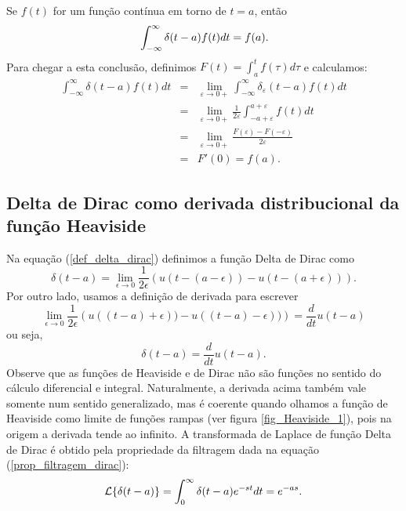 \documentclass[a4paper,10pt]{book}
\begin{document}
 Se $f(t)$ for um função contínua em torno de $t=a$, então
 \begin{equation}{\label{prop_filtragem_dirac}}
 \int_{-\infty}^\infty \delta(t-a)f(t)dt=f(a). 
 \end{equation}
 Para chegar a esta conclusão, definimos $F(t)=\int_a^t f(\tau)d\tau$ e calculamos:
 \begin{eqnarray*}
 \int_{-\infty}^\infty \delta(t-a)f(t)dt&=&\lim_{\varepsilon\to 0+}
 \int_{-\infty}^\infty \delta_\varepsilon(t-a)f(t)dt\\
 &=&\lim_{\varepsilon\to 0+}\frac{1}{2\varepsilon}\int_{-a+\varepsilon}^{a+\varepsilon} f(t)dt\\
 &=&\lim_{\varepsilon\to 0+}\frac{F(\varepsilon)-F(-\varepsilon)}{2\varepsilon}\\
 &=&F'(0)=f(a).
 \end{eqnarray*}
 \subsection{Delta de Dirac como derivada distribucional da função Heaviside}
 Na equação (\ref{def_delta_dirac}) definimos a função Delta de Dirac como
 \begin{equation}
 \delta(t-a)=\lim_{\epsilon\to 0}\frac{1}{2\epsilon}\left(u(t-(a-\epsilon))-u(t-(a+\epsilon))\right).
 \end{equation}
 Por outro lado, usamos a definição de derivada para escrever
 \begin{equation}
 \lim_{\epsilon\to 0}\frac{1}{2\epsilon}\left(u((t-a)+\epsilon))-u((t-a)-\epsilon))\right)=\frac{d}{dt}u(t-a)
 \end{equation}
 ou seja,
 \begin{equation}
 \delta(t-a)=\frac{d}{dt}u(t-a).
 \end{equation}
 Observe que as funções de Heaviside e de Dirac não são funções no sentido do cálculo diferencial e integral. Naturalmente, a derivada acima também vale somente num sentido generalizado, mas é coerente quando olhamos a função de Heaviside como limite de funções rampas (ver figura \ref{fig_Heaviside_1}), pois na origem a derivada tende ao infinito.
 A transformada de Laplace de função Delta de Dirac é obtido pela propriedade da filtragem dada na equação (\ref{prop_filtragem_dirac}):
 \begin{equation}{\label{prop_trans_delta_dirac}}
 \mathcal{L}\{\delta(t-a)\}=\int_0^\infty \delta(t-a)e^{-st}dt=e^{-as}.
 \end{equation}
\end{document}
